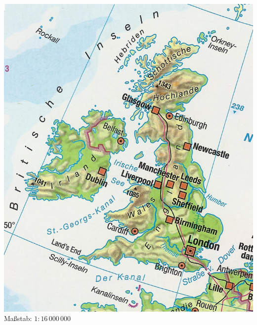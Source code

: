 \documentclass[a4paper,ngerman]{scrartcl}
\begin{document}
\begin{center}%
  \includegraphics[scale=5]{england-grob-grob} \\
  Maßstab: $1 : 16\,000\,000$
\end{center}
\newpage
\end{document}
